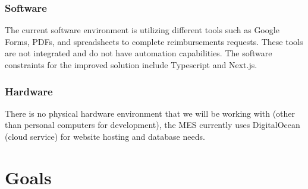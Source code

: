\documentclass{article}
\begin{document}
\subsubsection{Software}
The current software environment is utilizing different tools such as Google Forms, PDFs, and spreadsheets to complete reimbursements requests. These tools are not integrated and do not have automation capabilities. The software constraints for the improved solution include Typescript and Next.js. 

\subsubsection{Hardware}
There is no physical hardware environment that we will be working with (other than personal computers for development), the MES currently uses DigitalOcean (cloud service) for website hosting and database needs.

\section{Goals}
\end{document}
